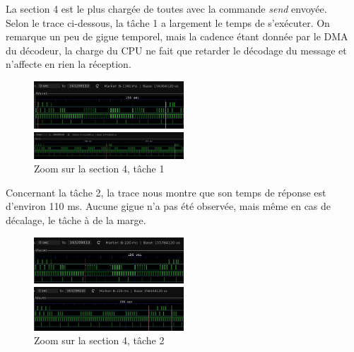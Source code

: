 \documentclass[11pt, a4paper]{article}
\begin{document}
La section 4 est le plus chargée de toutes avec la commande \textit{send} envoyée. \\

Selon le trace ci-dessous, la tâche 1 a largement le temps de s'exécuter.
On remarque un peu de gigue temporel, mais la cadence étant donnée par le DMA du décodeur,
la charge du CPU ne fait que retarder le décodage du message et n'affecte en rien la réception.

\begin{figure}[H]
    \begin{multicols}{2}
        \begin{center}
            \includegraphics[width=0.5\textwidth]{section4_send_t1_light_1}
        \end{center}
        \columnbreak
        \begin{center}
            \includegraphics[width=0.5\textwidth]{section4_send_t1_light_2}
        \end{center}
    \end{multicols}
    \caption{Zoom sur la section 4, tâche 1}
    \label{Zoom sur la section 4, tâche 1}
\end{figure}

Concernant la tâche 2, la trace nous montre que son temps de réponse est d'environ 110 ms.
Aucune gigue n'a pas été observée, mais même en cas de décalage, le tâche à de la marge.

\begin{figure}[H]
    \begin{multicols}{2}
        \begin{center}
            \includegraphics[width=0.5\textwidth]{section4_send_t2_cmd_1}
        \end{center}
        \columnbreak
        \begin{center}
            \includegraphics[width=0.5\textwidth]{section4_send_t2_cmd_2}
        \end{center}
    \end{multicols}
    \caption{Zoom sur la section 4, tâche 2}
    \label{Zoom sur la section 4, tâche 2}
\end{figure}
\end{document}
